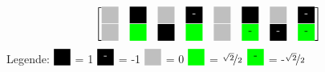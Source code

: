\begin{frame}
\begin{minipage}{0.9\textwidth}
\begin{center}
\[{\begin{bmatrix}
     \myboxZero 	& \myboxOnePos 		& \myboxZero 	& \myboxOneNeg 		& \myboxZero 	& \myboxOnePos 		& \myboxZero 	& \myboxOneNeg \\
     \myboxZero 	& \myboxSqrtPos 	& \myboxOnePos 	& \myboxSqrtPos		& \myboxZero	& \myboxSqrtNeg		& \myboxOneNeg	& \myboxSqrtNeg 
    \end{bmatrix}
   }
  \]
\vspace{0.5cm}
  Legende: $\myboxOnePos$ = 1 \quad $\myboxOneNeg$ = -1 \quad $\myboxZero$ = 0 \quad $\myboxSqrtPos$ = $\nicefrac{\sqrt{2}}{2}$ \quad $\myboxSqrtNeg$ = -$\nicefrac{\sqrt{2}}{2}$
  \label{pic:MatrizenDarstellungTwiddlefaktoren}
\end{center}
\endgroup
\end{minipage}

\end{frame}




